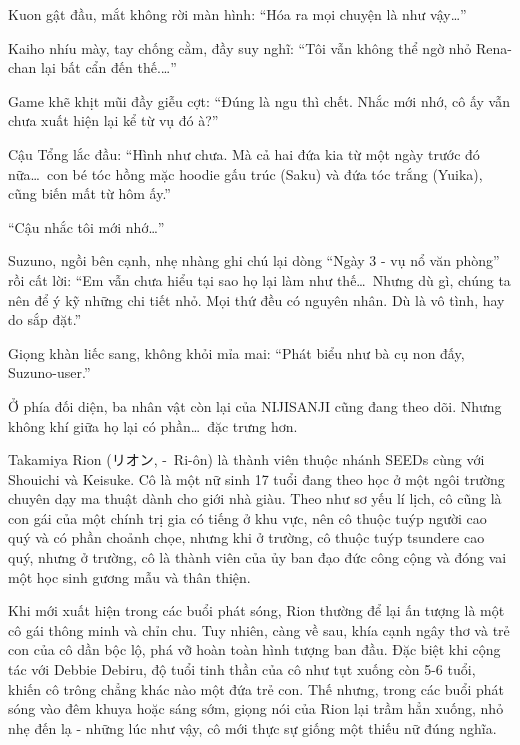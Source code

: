 \documentclass[../main.tex]{subfiles}
\begin{document}
Kuon gật đầu, mắt không rời màn hình: ``Hóa ra mọi chuyện là như vậy\dots''

Kaiho nhíu mày, tay chống cằm, đầy suy nghĩ: ``Tôi vẫn không thể ngờ nhỏ Rena-chan lại bất cẩn đến thế.\dots''

Game khẽ khịt mũi đầy giễu cợt: ``Đúng là ngu thì chết. Nhắc mới nhớ, cô ấy vẫn chưa xuất hiện lại kể từ vụ đó à?''

Cậu Tổng lắc đầu: ``Hình như chưa. Mà cả hai đứa kia từ một ngày trước đó nữa\dots\ con bé tóc hồng mặc hoodie gấu trúc (Saku) và đứa tóc trắng (Yuika), cũng biến mất từ hôm ấy.''

``Cậu nhắc tôi mới nhớ\dots''

Suzuno, ngồi bên cạnh, nhẹ nhàng ghi chú lại dòng ``Ngày 3 - vụ nổ văn phòng'' rồi cất lời: ``Em vẫn chưa hiểu tại sao họ lại làm như thế\dots\ Nhưng dù gì, chúng  ta nên để ý kỹ những chi tiết nhỏ. Mọi thứ đều có nguyên nhân. Dù là vô tình, hay do sắp đặt.''

Giọng khàn liếc sang, không khỏi mỉa mai: ``Phát biểu như bà cụ non đấy, Suzuno-user.''

Ở phía đối diện, ba nhân vật còn lại của NIJISANJI cũng đang theo dõi. Nhưng không khí giữa họ lại có phần\dots\ đặc trưng hơn.

\chrint


Takamiya Rion (リオン, -\ Ri-ôn) là thành viên thuộc nhánh SEEDs cùng với Shouichi và Keisuke. Cô là một nữ sinh 17 tuổi đang theo học ở một ngôi trường chuyên dạy ma thuật dành cho giới nhà giàu. Theo như sơ yếu lí lịch, cô cũng là con gái của một chính trị gia có tiếng ở khu vực, nên cô thuộc tuýp người cao quý và có phần choảnh chọe, nhưng khi ở trường, cô thuộc tuýp tsundere cao quý, nhưng ở trường, cô là thành viên của ủy ban đạo đức công cộng và đóng vai một học sinh gương mẫu và thân thiện.

Khi mới xuất hiện trong các buổi phát sóng, Rion thường để lại ấn tượng là một cô gái thông minh và chỉn chu. Tuy nhiên, càng về sau, khía cạnh ngây thơ và trẻ con của cô dần bộc lộ, phá vỡ hoàn toàn hình tượng ban đầu. Đặc biệt khi cộng tác với Debbie Debiru, độ tuổi tinh thần của cô như tụt xuống còn 5-6 tuổi, khiến cô trông chẳng khác nào một đứa trẻ con. Thế nhưng, trong các buổi phát sóng vào đêm khuya hoặc sáng sớm, giọng nói của Rion lại trầm hẳn xuống, nhỏ nhẹ đến lạ - những lúc như vậy, cô mới thực sự giống một thiếu nữ đúng nghĩa.
\end{document}
